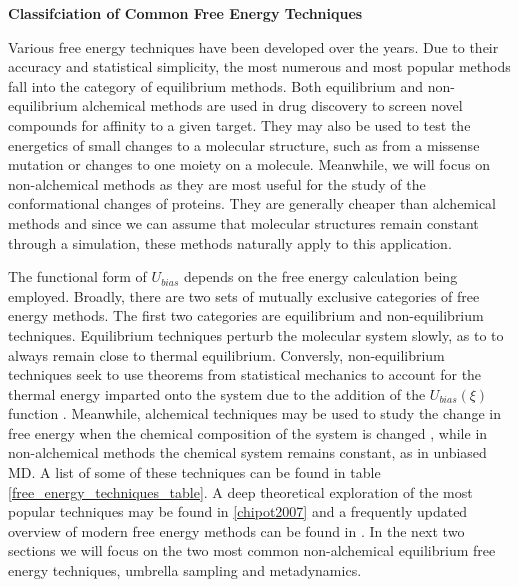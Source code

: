 \begin{table}
	\caption[Classifciation of Common Free Energy Techniques]{\textbf{Classifciation of Common Free Energy Techniques}} {Various free energy techniques have been developed over the years. Due to their accuracy and statistical simplicity, the most numerous and most popular methods fall into the category of equilibrium methods. Both equilibrium and non-equilibrium alchemical methods are used in drug discovery to screen novel compounds for affinity to a given target. They may also be used to test the energetics of small changes to a molecular structure, such as from a missense mutation or changes to one moiety on a molecule. Meanwhile, we will focus on non-alchemical methods as they are most useful for the study of the conformational changes of proteins. They are generally cheaper than alchemical methods and since we can assume that molecular structures remain constant through a simulation, these methods naturally apply to this application.}
	\label{timescales}
\end{table}

The functional form of $U_{bias}$ depends on the free energy calculation being employed. Broadly, there are two sets of mutually exclusive categories of free energy methods. The first two categories are equilibrium and non-equilibrium techniques. Equilibrium techniques perturb the molecular system slowly, as to to always remain close to thermal equilibrium. Conversly, non-equilibrium techniques seek to use theorems from statistical mechanics to account for the thermal energy imparted onto the system due to the addition of the $U_{bias}(\xi)$ function \cite{jarzynski1997a,jarzynski1997,crooks1999}. Meanwhile, alchemical techniques may be used to study the change in free energy when the chemical composition of the system is changed \cite{kirkwood1935}, while in non-alchemical methods the chemical system remains constant, as in unbiased MD. A list of some of these techniques can be found in table \ref{free_energy_techniques_table}. A deep theoretical exploration of the most popular techniques may be found in \ref{chipot2007} and a frequently updated overview of modern free energy methods can be found in \cite{henin2022}. In the next two sections we will focus on the two most common non-alchemical equilibrium free energy techniques, umbrella sampling and metadynamics. 



